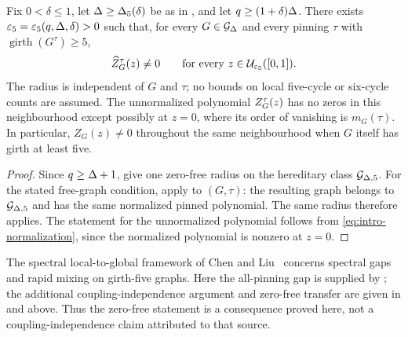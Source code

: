 \begin{theorem}
\label{thm:unrestricted-girth5}
Fix $0<\delta\le1$, let $\Delta\ge\Delta_5(\delta)$ be as in
, and let $q\ge(1+\delta)\Delta$.
There exists $\varepsilon_5=\varepsilon_5(q,\Delta,\delta)>0$ such that, for every
$G\in\mathcal{G}_{\Delta}$ and every pinning $\tau$ with
$\operatorname{girth}(G^\tau)\ge5$,
\[
 \widehat Z_{G}^{\tau}(z)\ne0
 \qquad\text{for every }z\in\mathcal U_{\varepsilon_5}([0,1]).
\]
The radius is independent of $G$ and $\tau$; no bounds on local
five-cycle or six-cycle counts are assumed.
The unnormalized polynomial $Z_{G}^{\tau}(z)$ has no zeros in this
neighbourhood except possibly at $z=0$, where its order of vanishing is
$m_G(\tau)$.  In particular, $Z_G(z)\ne0$ throughout the same
neighbourhood when $G$ itself has girth at least five.
\end{theorem}
\begin{proof}
Since $q\ge\Delta+1$,  give
one zero-free radius on the hereditary class $\mathcal{G}_{\Delta,5}$.
For the stated free-graph condition, apply
 to $(G,\tau)$: the resulting graph
belongs to $\mathcal{G}_{\Delta,5}$ and has the same normalized pinned polynomial.
The same radius therefore applies.  The statement for the unnormalized
polynomial follows from \eqref{eq:intro-normalization}, since the normalized
polynomial is nonzero at $z=0$.
\end{proof}

\begin{remark}
The spectral local-to-global framework of Chen and
Liu~\cite{ChenLiu2026LocalGlobal} concerns spectral gaps and rapid mixing
on girth-five graphs.  Here the all-pinning gap is supplied by
; the additional coupling-independence argument
and zero-free transfer are given in  and above.
Thus the zero-free statement is a consequence proved here, not a
coupling-independence claim attributed to that source.
\end{remark}
